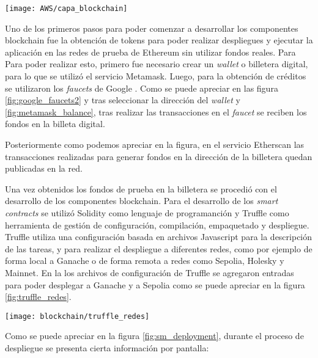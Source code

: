 \begin{center}
   \texttt{[image: AWS/capa\_blockchain]}
   \label{fig:capa_blockchain}
\end{center}


Uno de los primeros pasos para poder comenzar a desarrollar los componentes blockchain fue la obtención de tokens para poder realizar despliegues y ejecutar la aplicación en las redes de prueba de Ethereum sin utilizar fondos reales. Para Para poder realizar esto, primero fue necesario crear un \textit{wallet} o billetera digital, para lo que se utilizó el servicio Metamask. Luego, para la obtención de créditos se utilizaron los \textit{faucets} de Google \citep{google_faucets}. Como se puede apreciar en las figura \ref{fig:google_faucets2} y tras seleccionar la dirección del \textit{wallet} y \ref{fig:metamask_balance}, tras realizar las transacciones en el \textit{faucet} se reciben los fondos en la billeta digital. 


Posteriormente como podemos apreciar en la figura, en el servicio Etherscan las transacciones realizadas para generar fondos en la dirección de la billetera quedan publicadas en la red.

Una vez obtenidos los fondos de prueba en la billetera se procedió con el desarrollo de los componentes blockchain. Para el desarrollo de los \textit{smart contracts} se utilizó Solidity como lenguaje de programanción y Truffle como herramienta de gestión de configuración, compilación, empaquetado y despliegue. Truffle utiliza una configuración basada en archivos Javascript para la descripción de las tareas, y para realizar el despliegue a diferentes redes, como por ejemplo de forma local a Ganache o de forma remota a redes como Sepolia, Holesky y Mainnet. En la los archivos de configuración de Truffle se agregaron entradas para poder desplegar a Ganache y a Sepolia como se puede apreciar en la figura \ref{fig:truffle_redes}.

\begin{center}
   \texttt{[image: blockchain/truffle\_redes]}
   \label{fig:truffle_redes}
\end{center}

Como se puede apreciar en la figura \ref{fig:sm_deployment}, durante el proceso de despliegue se presenta cierta información por pantalla:

